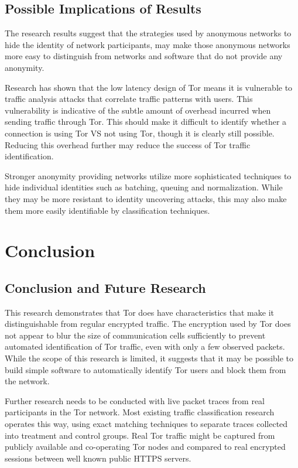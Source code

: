 

\section{Possible Implications of Results}

The research results suggest that the strategies used by anonymous networks to
hide the identity of network participants, may make those anonymous networks
more easy to distinguish from networks and software that do not provide any
anonymity.

Research has shown that the low latency design of Tor means it is vulnerable to
traffic analysis attacks that correlate traffic patterns with users. This
vulnerability is indicative of the subtle amount of overhead incurred when
sending traffic through Tor. This should make it difficult to identify whether a
connection is using Tor VS not using Tor, though it is clearly still possible.
Reducing this overhead further may reduce the success of Tor traffic
identification.

Stronger anonymity providing networks utilize more sophisticated techniques to
hide individual identities such as batching, queuing and normalization. While
they may be more resistant to identity uncovering attacks, this may also make
them more easily identifiable by classification techniques.

\chapter{Conclusion}

\section{Conclusion and Future Research}

This research demonstrates that Tor does have characteristics that make it
distinguishable from regular encrypted traffic. The encryption used by Tor does
not appear to blur the size of communication cells sufficiently to prevent
automated identification of Tor traffic, even with only a few observed packets.
While the scope of this research is limited, it suggests that it may be
possible to build simple software to automatically identify Tor users and block
them from the network.

Further research needs to be conducted with live packet traces from real
participants in the Tor network. Most existing traffic classification research
operates this way, using exact matching techniques to separate traces collected
into treatment and control groups. Real Tor traffic might be captured from
publicly available and co-operating Tor nodes and compared to real encrypted
sessions between well known public HTTPS servers.

